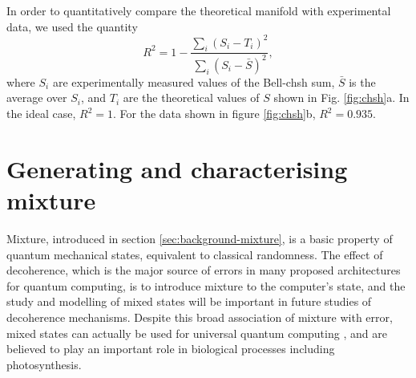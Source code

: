 In order to quantitatively compare the theoretical manifold with experimental data, we used the quantity \begin{equation}R^{2}=1-\frac{\sum_{i} (S_{i}-T_{i})^{2}}{\sum_{i} (S_{i}-\bar{S})^{2}},\end{equation} where $S_{i}$ are experimentally measured values of the Bell-\acrshort{chsh} sum, $\bar{S}$ is the average over $S_{i}$, and $T_{i}$ are the theoretical values of $S$ shown in Fig. \ref{fig:chsh}a. In the ideal case, $R^2=1$. For the data shown in figure \ref{fig:chsh}b, $R^2=0.935$.

\section{Generating and characterising mixture}
\label{sec:cnotmz-mixture}

Mixture, introduced in section \ref{sec:background-mixture}, is a basic property of quantum mechanical states, equivalent to classical randomness. The effect of decoherence, which is the major source of errors in many proposed architectures for quantum computing, is to introduce mixture to the computer's state, and the study and modelling of mixed states will be important in future studies of decoherence mechanisms.  Despite this broad association of mixture with error, mixed states can actually be used for universal quantum computing \cite{Lanyon2008a}, and are believed to play an important role in biological processes \cite{Mohseni2008a, Plenio2008a} including photosynthesis. 

